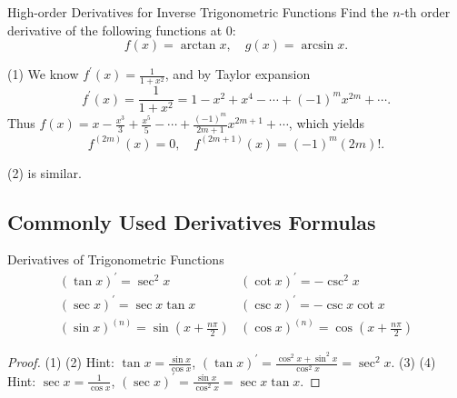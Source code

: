 \begin{example}{High-order Derivatives for Inverse Trigonometric Functions}{}
  Find the $n$-th order derivative of the following functions at $0$:
  \begin{equation}
    f(x) = \arctan x, \quad
    g(x) = \arcsin x.
  \end{equation}
\end{example}

\begin{solution}
  (1) We know $f^{\prime}(x) = \frac{1}{1+x^2}$, and by Taylor expansion
  \begin{equation}
    f^{\prime}(x) = \frac{1}{1+x^2} = 1 - x^2 + x^4 - \cdots + (-1)^mx^{2m} + \cdots.
  \end{equation}
  Thus $f(x) = x - \frac{x^3}{3} + \frac{x^5}{5} - \cdots +
  \frac{(-1)^m}{2m+1}x^{2m+1} + \cdots$,
  which yields
  \begin{equation}
    f^{(2m)}(x) = 0, \quad f^{(2m+1)}(x) = (-1)^m (2m)!.
  \end{equation}

  (2) is similar.
\end{solution}

\subsection{Commonly Used Derivatives Formulas}

\begin{proposition}{Derivatives of Trigonometric Functions}{}
  \begin{equation}
    \begin{array}{ll}
      (\tan x)^{\prime} = \sec^2 x & (\cot x)^{\prime} = - \csc^2 x\\
      (\sec x)^{\prime} = \sec x \tan x&  (\csc x)^{\prime} = - \csc x \cot x\\
      (\sin x)^{(n)} = \sin \left( x + \frac{n\pi}{2} \right)&(\cos x)^{(n)} = \cos \left( x + \frac{n\pi}{2}\right)
    \end{array}
  \end{equation}
\end{proposition}

\begin{proof}
  (1) (2) Hint: $\tan x = \frac{\sin x}{\cos x}$, $(\tan x)^{\prime} =
  \frac{\cos^2 x + \sin^2 x}{\cos^2 x} = \sec^2 x$.
  (3) (4) Hint: $\sec x = \frac{1}{\cos x}$,
  $(\sec x)^{\prime} = \frac{\sin x}{\cos^2 x} = \sec x \tan x$.
\end{proof}

